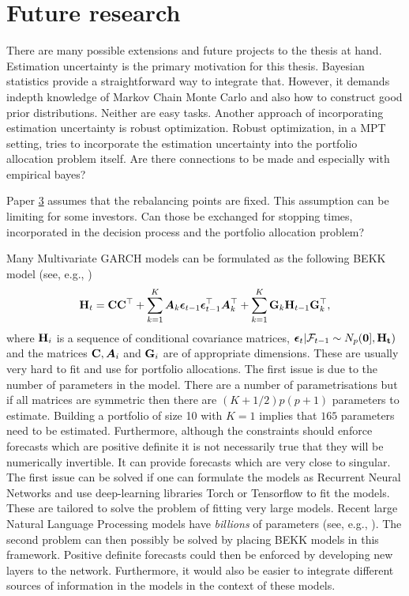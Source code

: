 \documentclass[12pt, oneside]{book}\usepackage{knitr}
\begin{document}
{%
\chapter{Future research}\label{ch:future}


There are many possible extensions and future projects to the thesis at hand.
Estimation uncertainty is the primary motivation for this thesis.
Bayesian statistics provide a straightforward way to integrate that. 
However, it demands indepth knowledge of Markov Chain Monte Carlo and also how to construct good prior distributions.
Neither are easy tasks.
Another approach of incorporating estimation uncertainty is robust optimization.
Robust optimization, in a MPT setting, tries to incorporate the estimation uncertainty into the portfolio allocation problem itself.
Are there connections to be made and especially with empirical bayes?

Paper \hyperref[sec:paper3]{3} assumes that the rebalancing points are fixed.
This assumption can be limiting for some investors.
Can those be exchanged for stopping times, incorporated in the decision process and the portfolio allocation problem?

Many Multivariate GARCH models can be formulated as the following BEKK model (see, e.g., \citet{engle1995multivariate})
\begin{equation}\label{eqn:BEKK}
  \mathbf{H}_t = \mathbf{C} \mathbf{C}^\top + \sum_{k=1}^K \mbox{\boldmath$A$}_k \boldsymbol{\epsilon}_{t-1}\boldsymbol{\epsilon}_{t-1}^\top \mbox{\boldmath$A$}_k^\top + \sum_{k=1}^K \mathbf{G}_k \mathbf{H}_{t-1}\mathbf{G}_k^\top,
\end{equation}
where $\mathbf{H}_i$ is a sequence of conditional covariance matrices, $\boldsymbol{\epsilon}_t | \mathcal{F}_{t-1} \sim N_p(\mathbf{0], \mathbf{H}_t})$ and the matrices $\mathbf{C}, \mbox{\boldmath$A$}_i$ and $\mathbf{G}_i$ are of appropriate dimensions.
These are usually very hard to fit and use for portfolio allocations. 
The first issue is due to the number of parameters in the model.
There are a number of parametrisations but if all matrices are symmetric then there are $(K+1/2)p(p+1)$ parameters to estimate. 
Building a portfolio of size 10 with $K=1$ implies that $165$ parameters need to be estimated.
Furthermore, although the constraints should enforce forecasts which are positive definite it is not necessarily true that they will be numerically invertible.
It can provide forecasts which are very close to singular.
The first issue can be solved if one can formulate the models as Recurrent Neural Networks and use deep-learning libraries Torch or Tensorflow to fit the models. 
These are tailored to solve the problem of fitting very large models.
Recent large Natural Language Processing models have \textit{billions} of parameters (see, e.g., \citet{brown2020language}). 
The second problem can then possibly be solved by placing BEKK models in this framework.
Positive definite forecasts could then be enforced by developing new layers to the network. 
Furthermore, it would also be easier to integrate different sources of information in the models in the context of these models.

}
\end{document}
